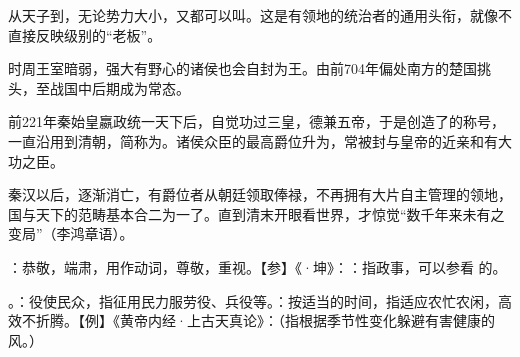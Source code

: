 {\begin{lyenumerate}
从天子到，无论势力大小，又都可以叫。这是有领地的统治者的通用头衔，就像不直接反映级别的“老板”。

时周王室暗弱，强大有野心的诸侯也会自封为王。由前704年偏处南方的楚国挑头，至战国中后期成为常态。%

\item {}前221年秦始皇嬴政统一天下后，自觉功过三皇，德兼五帝，于是创造了的称号，一直沿用到清朝，简称为。诸侯众臣的最高爵位升为，常被封与皇帝的近亲和有大功之臣。

秦汉以后，逐渐消亡，有爵位者从朝廷领取俸禄，不再拥有大片自主管理的领地，国与天下的范畴基本合二为一了。直到清末开眼看世界，才惊觉“数千年来未有之变局”（李鸿章语）。
\end{lyenumerate}

\item {}：恭敬，端肃，用作动词，尊敬，重视。【参】《·坤》：：指政事，可以参看  的。
\item {}。：役使民众，指征用民力服劳役、兵役等。：按适当的时间，指适应农忙农闲，高效不折腾。【例】《黄帝内经·上古天真论》：（指根据季节性变化躲避有害健康的风。）
}
{}


